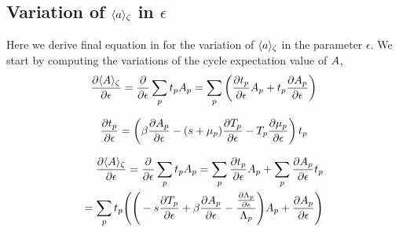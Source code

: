 \documentclass[aps,pre,
                showpacs,
                twocolumn,
                groupedaddress,
                superscriptaddress,
                floatfix]{revtex4-1}
\begin{document}
\subsection{Variation of $\langle {\ensuremath{a}} \rangle_{\zeta}$ in $\epsilon$}
\label{sect:VarObsEps}

Here we derive final equation in  for the
variation of $\langle {a} \rangle_{\zeta}$ in the parameter $\epsilon$.
We
start by computing the variations of the cycle expectation value of $A$,
\begin{eqnarray*}
\frac{\partial \langle {\ensuremath{A}} \rangle_{\zeta}}{\partial \epsilon}
= \frac{\partial}{\partial \epsilon}\sum_{p}t_{p}A_{p}
= \sum_{p}\left(\frac{\partial t_{p}}{\partial \epsilon}A_{p}
                + t_{p} \frac{\partial A_{p}}{\partial \epsilon} \right)
\end{eqnarray*}

\[
\frac{\pde t_{p}}{\pde \epsilon}
    =
\left(
  \beta \frac{\pde \Obser_{p}}{\pde \epsilon}
 -(s+\eigRe_p)\frac{\pde \period{p}}{\pde \epsilon}
 - \period{p}\frac{\pde \eigRe_p}{\pde \epsilon}
\right) t_{p}
\]

\begin{eqnarray*}
\frac{\partial \langle {\ensuremath{A}} \rangle_{\zeta}}{\partial \epsilon}
= \frac{\partial}{\partial \epsilon}\sum_{p}t_{p}A_{p}
= \sum_{p}\frac{\partial t_{p}}{\partial \epsilon}A_{p} + \sum_{p} \frac{\partial A_{p}}{\partial \epsilon} t_{p}
\\ = \sum_{p}t_{p}\Bigg( \Bigg( -s\frac{\partial {\ensuremath{T_{p}}}}{\partial \epsilon} + \beta \frac{\partial A_{p}}{\partial \epsilon} - \frac{\frac{\partial \Lambda_{p}}{\partial \epsilon}}{\Lambda_{p}}\Bigg) A_{p} +\frac{\partial A_{p}}{\partial \epsilon} \Bigg)
\end{eqnarray*}
\end{document}
